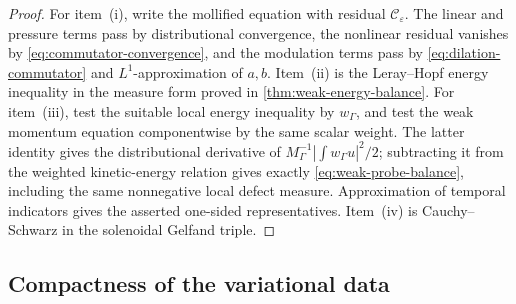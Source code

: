\documentclass[11pt]{amsart}
\numberwithin{equation}{section}
\theoremstyle{plain}
\theoremstyle{definition}
\theoremstyle{remark}
\begin{document}
\begin{proof}
For item~\textup{(i)}, write the mollified equation with residual
\(\mathcal C_\varepsilon\).  The linear and pressure terms pass by
distributional convergence, the nonlinear residual vanishes by
\eqref{eq:commutator-convergence}, and the modulation terms pass by
\eqref{eq:dilation-commutator} and \(L^1\)-approximation of \(a,b\).
Item~\textup{(ii)} is the Leray--Hopf energy inequality in the measure form
proved in \cref{thm:weak-energy-balance}.  For item~\textup{(iii)}, test the
suitable local energy inequality by \(w_\Gamma\), and test the weak momentum
equation componentwise by the same scalar weight.  The latter identity gives
the distributional derivative of
\(M_\Gamma^{-1}|\int w_\Gamma u|^2/2\); subtracting it from the weighted
kinetic-energy relation gives exactly \eqref{eq:weak-probe-balance}, including
the same nonnegative local defect measure.  Approximation of temporal
indicators gives the asserted one-sided representatives.  Item~\textup{(iv)}
is Cauchy--Schwarz in the solenoidal Gelfand triple.
\end{proof}

\subsection{Compactness of the variational data}
\end{document}
